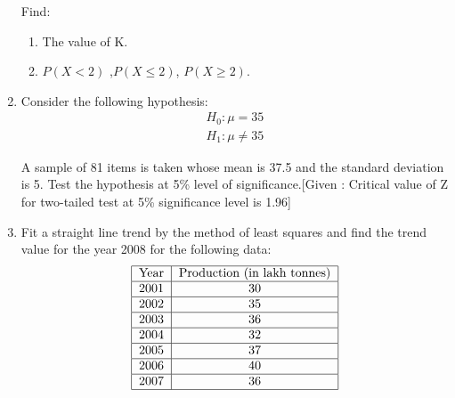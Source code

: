 \documentclass[a4paper,12pt]{article}
\begin{document}
\begin{enumerate}
Find:\
\begin{enumerate}
\item The value of K.
\item $P(X< 2)$ ,$P(X \leq 2)$, $P(X \geq 2)$.
\end{enumerate}

\item Consider the following hypothesis: \
\begin{align}
        H_0: \mu = 35\\
	H_1: \mu \neq 35
\end{align}

A sample of 81 items is taken whose mean is 37.5 and the standard deviation is 5. Test the hypothesis at 5\% level of significance.[Given : Critical value of Z for two-tailed test at 5\% significance level is 1.96]

\item Fit a straight line trend by the method of least squares and  find the trend value for the year 2008 for the following data:\\
$$\begin{tabular}{|c|c|}
\hline
Year & Production (in lakh tonnes) \\
\hline
2001 & 30 \\
\hline 
2002 & 35 \\
\hline 
2003 & 36 \\
\hline 
2004 & 32 \\
\hline 
2005 & 37 \\
\hline 
2006 & 40 \\
\hline 
2007 & 36 \\
\hline 
\end{tabular}$$

\end{enumerate}
\end{document}
